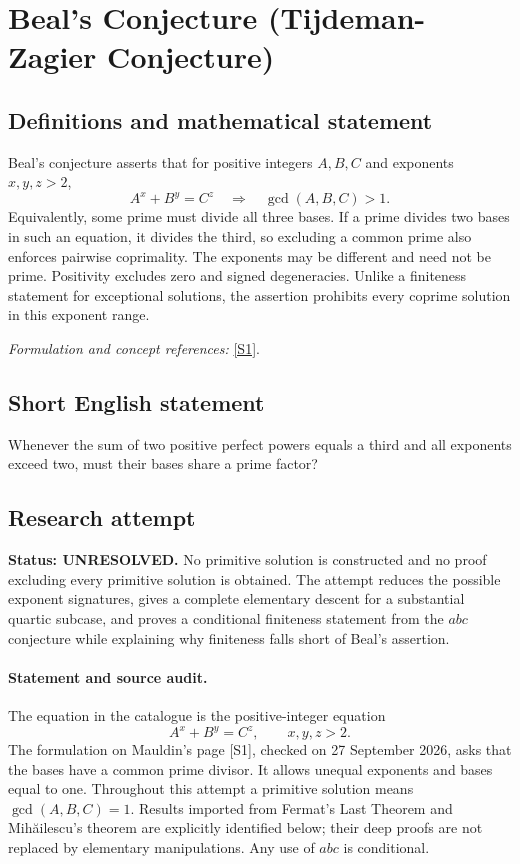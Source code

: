 \documentclass[11pt]{article}
\begin{document}
\section*{\texorpdfstring{Beal's Conjecture (Tijdeman-Zagier Conjecture)}{Beal's Conjecture (Tijdeman-Zagier Conjecture)}}\label{366}
\subsection{Definitions and mathematical statement}
Beal's conjecture asserts that for positive integers $A,B,C$ and exponents $x,y,z>2$,
\[
 A^x+B^y=C^z\quad\Longrightarrow\quad\gcd(A,B,C)>1.
\]
Equivalently, some prime must divide all three bases. If a prime divides two bases in such an equation, it divides the third, so excluding a common prime also enforces pairwise coprimality. The exponents may be different and need not be prime. Positivity excludes zero and signed degeneracies. Unlike a finiteness statement for exceptional solutions, the assertion prohibits every coprime solution in this exponent range.
\par\smallskip\textit{Formulation and concept references:} \href{https://sites.math.unt.edu/~mauldin/beal.html}{[S1]}.

\subsection{Short English statement}
Whenever the sum of two positive perfect powers equals a third and all exponents exceed two, must their bases share a prime factor?
\subsection{Research attempt}
\textbf{Status: UNRESOLVED.} No primitive solution is constructed and no proof excluding every primitive solution is obtained. The attempt reduces the possible exponent signatures, gives a complete elementary descent for a substantial quartic subcase, and proves a conditional finiteness statement from the $abc$ conjecture while explaining why finiteness falls short of Beal's assertion.

\paragraph{Statement and source audit.}
The equation in the catalogue is the positive-integer equation
\[
 A^x+B^y=C^z,\qquad x,y,z>2.
\]
The formulation on Mauldin's page [S1], checked on 27 September 2026, asks that the bases have a common prime divisor. It allows unequal exponents and bases equal to one. Throughout this attempt a primitive solution means $\gcd(A,B,C)=1$. Results imported from Fermat's Last Theorem and Mih\u{a}ilescu's theorem are explicitly identified below; their deep proofs are not replaced by elementary manipulations. Any use of $abc$ is conditional.
\end{document}
